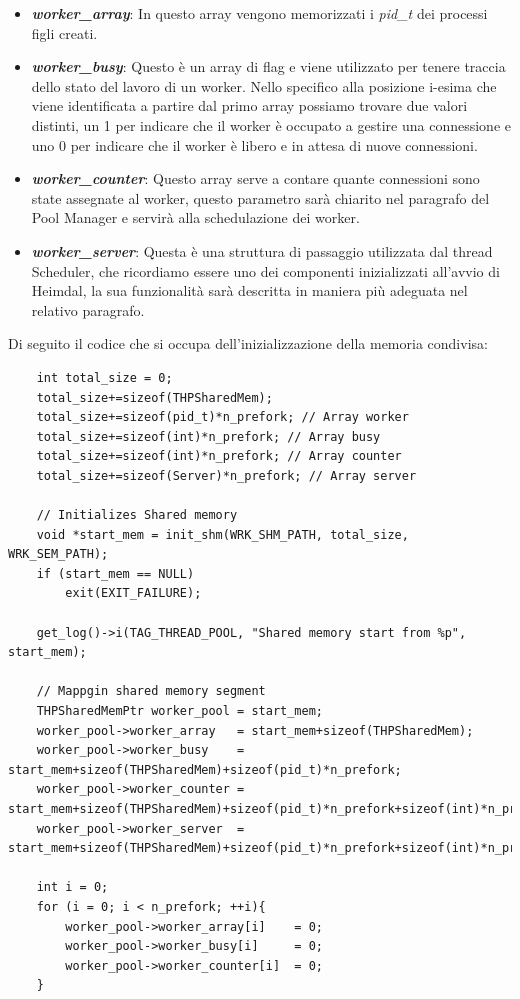 \documentclass[italian]{tktltiki2}
\begin{document}
\begin{itemize}
	\item \textbf{\emph{worker\_array}}: In questo array vengono memorizzati i \emph{pid\_t} dei processi figli creati.          
	\item \textbf{\emph{worker\_busy}}: Questo è un array di flag e viene utilizzato per tenere traccia dello stato del lavoro di un worker. Nello specifico alla posizione i-esima che viene identificata a partire dal primo array possiamo trovare due valori distinti, un 1 per indicare che il worker è occupato a gestire una connessione e uno 0 per indicare che il worker è libero e in attesa di nuove connessioni.
	\item \textbf{\emph{worker\_counter}}: Questo array serve a contare quante connessioni sono state assegnate al worker, questo parametro sarà chiarito nel paragrafo del Pool Manager e servirà alla schedulazione dei worker.
	\item \textbf{\emph{worker\_server}}: Questa è una struttura di passaggio utilizzata dal thread Scheduler, che ricordiamo essere uno dei componenti inizializzati all'avvio di Heimdal, la sua funzionalità sarà descritta in maniera più adeguata nel relativo paragrafo.
\end{itemize}
Di seguito il codice che si occupa dell'inizializzazione della memoria condivisa:
\begin{lstlisting}
	int total_size = 0;
    total_size+=sizeof(THPSharedMem);
    total_size+=sizeof(pid_t)*n_prefork; // Array worker
    total_size+=sizeof(int)*n_prefork; // Array busy
    total_size+=sizeof(int)*n_prefork; // Array counter
    total_size+=sizeof(Server)*n_prefork; // Array server

    // Initializes Shared memory
    void *start_mem = init_shm(WRK_SHM_PATH, total_size, WRK_SEM_PATH);
    if (start_mem == NULL)
        exit(EXIT_FAILURE);

    get_log()->i(TAG_THREAD_POOL, "Shared memory start from %p", start_mem);

    // Mappgin shared memory segment
    THPSharedMemPtr worker_pool = start_mem;
    worker_pool->worker_array   = start_mem+sizeof(THPSharedMem);
    worker_pool->worker_busy    = start_mem+sizeof(THPSharedMem)+sizeof(pid_t)*n_prefork;
    worker_pool->worker_counter = start_mem+sizeof(THPSharedMem)+sizeof(pid_t)*n_prefork+sizeof(int)*n_prefork;
    worker_pool->worker_server  = start_mem+sizeof(THPSharedMem)+sizeof(pid_t)*n_prefork+sizeof(int)*n_prefork+sizeof(int)*n_prefork;

    int i = 0;
    for (i = 0; i < n_prefork; ++i){
        worker_pool->worker_array[i]    = 0;
        worker_pool->worker_busy[i]     = 0;
        worker_pool->worker_counter[i]  = 0;
    }
\end{lstlisting}
\end{document}
